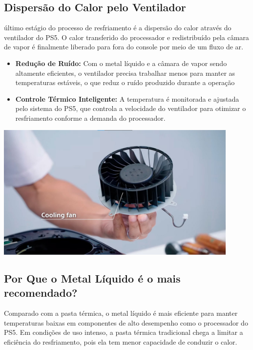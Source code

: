 \documentclass[12pt]{article}
\begin{document}
\subsection{Dispersão do Calor pelo Ventilador}
último estágio do processo de resfriamento é a dispersão do calor através do ventilador do PS5. O calor transferido do processador e redistribuído pela câmara de vapor é finalmente liberado para fora do console por meio de um fluxo de ar.
\begin{itemize}
    \item \textbf{Redução de Ruído: } Com o metal líquido e a câmara de vapor sendo altamente eficientes, o ventilador precisa trabalhar menos para manter as temperaturas estáveis, o que reduz o ruído produzido durante a operação
    \item \textbf{Controle Térmico Inteligente:}  A temperatura é monitorada e ajustada pelo sistema do PS5, que controla a velocidade do ventilador para otimizar o resfriamento conforme a demanda do processador.
\end{itemize}
\begin{adjustbox}{center,caption={Fan utilizada no playstation 5 (Imagem: PlayStation/Reprodução)},nofloat=figure,vspace=\bigskipamount}
    \centering
    \includegraphics[width=12cm]{ventoinha.png}
\end{adjustbox}
\subsection{ Por Que o Metal Líquido é o mais recomendado?}
Comparado com a pasta térmica, o metal líquido é mais eficiente para manter temperaturas baixas em componentes de alto desempenho como o processador do PS5. Em condições de uso intenso, a pasta térmica tradicional chega a limitar a eficiência do resfriamento, pois ela tem menor capacidade de conduzir o calor.
\end{document}
